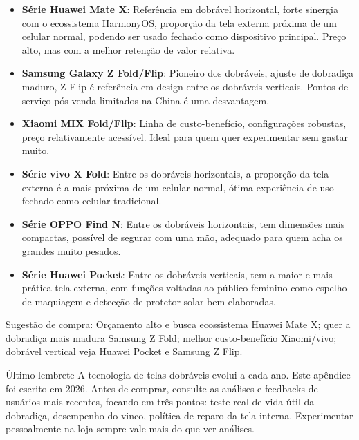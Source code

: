 \begin{itemize}
  \item \textbf{Série Huawei Mate X}: Referência em dobrável horizontal, forte sinergia com o ecossistema HarmonyOS, proporção da tela externa próxima de um celular normal, podendo ser usado fechado como dispositivo principal. Preço alto, mas com a melhor retenção de valor relativa.
  \item \textbf{Samsung Galaxy Z Fold/Flip}: Pioneiro dos dobráveis, ajuste de dobradiça maduro, Z Flip é referência em design entre os dobráveis verticais. Pontos de serviço pós-venda limitados na China é uma desvantagem.
  \item \textbf{Xiaomi MIX Fold/Flip}: Linha de custo-benefício, configurações robustas, preço relativamente acessível. Ideal para quem quer experimentar sem gastar muito.
  \item \textbf{Série vivo X Fold}: Entre os dobráveis horizontais, a proporção da tela externa é a mais próxima de um celular normal, ótima experiência de uso fechado como celular tradicional.
  \item \textbf{Série OPPO Find N}: Entre os dobráveis horizontais, tem dimensões mais compactas, possível de segurar com uma mão, adequado para quem acha os grandes muito pesados.
  \item \textbf{Série Huawei Pocket}: Entre os dobráveis verticais, tem a maior e mais prática tela externa, com funções voltadas ao público feminino como espelho de maquiagem e detecção de protetor solar bem elaboradas.
\end{itemize}

Sugestão de compra: Orçamento alto e busca ecossistema Huawei Mate X; quer a dobradiça mais madura Samsung Z Fold; melhor custo-benefício Xiaomi/vivo; dobrável vertical veja Huawei Pocket e Samsung Z Flip.

\begin{tcbinfo}{Último lembrete}
A tecnologia de telas dobráveis evolui a cada ano. Este apêndice foi escrito em 2026. Antes de comprar, consulte as análises e feedbacks de usuários mais recentes, focando em três pontos: teste real de vida útil da dobradiça, desempenho do vinco, política de reparo da tela interna. Experimentar pessoalmente na loja sempre vale mais do que ver análises.

\end{tcbinfo}
